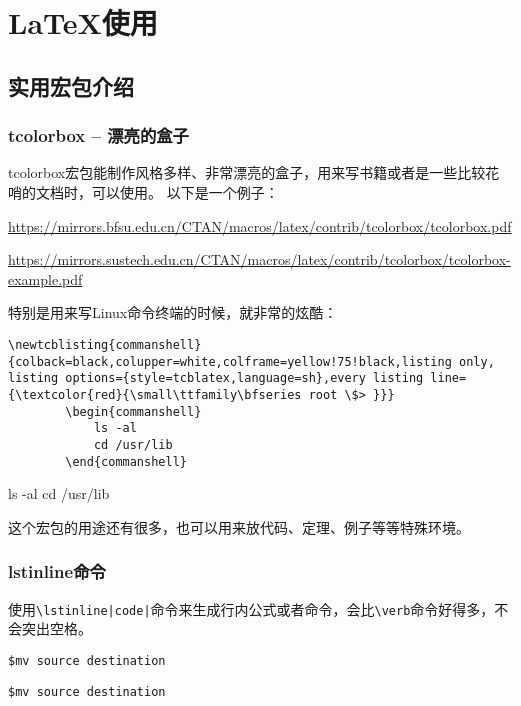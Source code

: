 \chapter{\LaTeX{}使用}

\section{实用宏包介绍}
\subsection{tcolorbox -- 漂亮的盒子}
tcolorbox宏包能制作风格多样、非常漂亮的盒子，用来写书籍或者是一些比较花哨的文档时，可以使用。
以下是一个例子：

\begin{tcolorbox}[title = tcolorbox的官方文档链接]
	\url{https://mirrors.bfsu.edu.cn/CTAN/macros/latex/contrib/tcolorbox/tcolorbox.pdf}
\end{tcolorbox}
\begin{tcolorbox}[title = tcolorbox的一些使用例子,colframe=red!50!white]
	\url{https://mirrors.sustech.edu.cn/CTAN/macros/latex/contrib/tcolorbox/tcolorbox-example.pdf}
\end{tcolorbox}

特别是用来写Linux命令终端的时候，就非常的炫酷：
\begin{tcolorbox}
	\begin{lstlisting}[language=Tex]
		\newtcblisting{commanshell}{colback=black,colupper=white,colframe=yellow!75!black,listing only, listing options={style=tcblatex,language=sh},every listing line={\textcolor{red}{\small\ttfamily\bfseries root \$> }}}
		\begin{commanshell}
			ls -al
			cd /usr/lib
		\end{commanshell}
	\end{lstlisting}
	\tcblower

	\begin{commanshell}
ls -al
cd /usr/lib
	\end{commanshell}
\end{tcolorbox}
这个宏包的用途还有很多，也可以用来放代码、定理、例子等等特殊环境。

\subsection{lstinline命令}
使用\lstinline$\lstinline|code|$命令来生成行内公式或者命令，会比\lstinline|\verb|命令好得多，不会突出空格。
\begin{tcolorbox}[title = 使用verb的效果,colframe=blue]
	\verb*|$mv source destination|
\end{tcolorbox}
\begin{tcolorbox}[title=使用lstinline的效果,colframe=orange!50!white]
	\lstinline|$mv source destination|
\end{tcolorbox}

